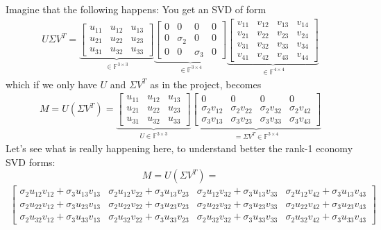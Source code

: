 \documentclass[11.5pt]{article}
\theoremstyle{definition}
\begin{document}
Imagine that the following happens: You get an SVD of form
\begin{align*} U\Sigma V^T=
\underbrace{\begin{bmatrix}
u_{11} & u_{12} & u_{13} \\ 
u_{21} & u_{22} & u_{23} \\ 
u_{31} & u_{32} & u_{33}
\end{bmatrix} }_{\in\mathbb{F}^{3\times 3}}
\underbrace{\begin{bmatrix}
0 & 0 & 0 & 0 \\ 
0 & \sigma_2 & 0 & 0 \\ 
0 & 0 & \sigma_3 & 0
\end{bmatrix}}_{\in\mathbb{F}^{3\times 4}}
\underbrace{\begin{bmatrix}
v_{11} & v_{12} & v_{13} & v_{14}\\ 
v_{21} & v_{22} & v_{23} & v_{24}\\ 
v_{31} & v_{32} & v_{33} & v_{34}\\
v_{41} & v_{42} & v_{43} & v_{44}
\end{bmatrix}}_{\in\mathbb{F}^{4\times 4}}
\end{align*}
which if we only have $U$ and $\Sigma V^T$ as in the project, becomes
\begin{align}\label{completeSVD}
 M=U(\Sigma V^T)=
\underbrace{\begin{bmatrix}
u_{11} & u_{12} & u_{13} \\ 
u_{21} & u_{22} & u_{23} \\ 
u_{31} & u_{32} & u_{33}
\end{bmatrix}}_{U\in \mathbb{F}^{3\times 3}}
\underbrace{
\begin{bmatrix}
0      & 0      & 0      & 0\\ 
\sigma_2 v_{12} & \sigma_2 v_{22} & \sigma_2v_{32} & \sigma_2v_{42}\\
\sigma_3 v_{13} & \sigma_3 v_{23} & \sigma_3 v_{33} & \sigma_3v_{43}
\end{bmatrix}}_{=\Sigma V^T\in \mathbb{F}^{3\times 4}}
\end{align}
Let's see what is really happening here, to understand better the rank-1 economy SVD forms:
\begin{equation}\label{em}
M=U(\Sigma V^T)=
\end{equation}
\begin{align*} 
\begin{bmatrix}
\sigma_2 u_{12}v_{12}+\sigma_3 u_{13}v_{13} & \sigma_2 u_{12}v_{22}+\sigma_3 u_{13}v_{23} & \sigma_2 u_{12}v_{32}+\sigma_3 u_{13}v_{33} & \sigma_2 u_{12}v_{42}+\sigma_3 u_{13}v_{43} \\ 
\sigma_2 u_{22}v_{12}+\sigma_3 u_{23}v_{13} & \sigma_2 u_{22}v_{22}+\sigma_3 u_{23}v_{23} & \sigma_2 u_{22}v_{32}+\sigma_3 u_{23}v_{33} & \sigma_2 u_{22}v_{42}+\sigma_3 u_{23}v_{43} \\ 
\sigma_2 u_{32}v_{12}+\sigma_3 u_{33}v_{13} & \sigma_2 u_{32}v_{22}+\sigma_3 u_{33}v_{23} & \sigma_2 u_{32}v_{32}+\sigma_3 u_{33}v_{33} & \sigma_2 u_{32}v_{42}+\sigma_3 u_{33}v_{43}
\end{bmatrix} 
\end{align*}
\end{document}
